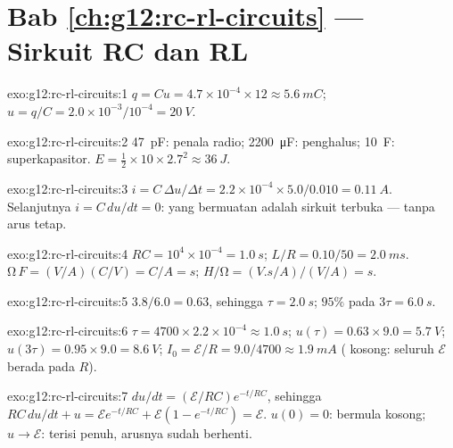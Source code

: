 \section*{Bab \ref{ch:g12:rc-rl-circuits} --- Sirkuit RC dan RL}

\begin{solution}{exo:g12:rc-rl-circuits:1}
$q = Cu = 4.7\times10^{-4} \times 12 \approx \qty{5.6}{mC}$;
$u = q/C = 2.0\times10^{-3}/10^{-4} = \qty{20}{V}$.
\end{solution}

\begin{solution}{exo:g12:rc-rl-circuits:2}
\qty{47}{pF}: penala radio; \qty{2200}{\micro F}: penghalus; \qty{10}{F}:
superkapasitor. $E = \tfrac12 \times 10 \times 2.7^2 \approx \qty{36}{J}$.
\end{solution}

\begin{solution}{exo:g12:rc-rl-circuits:3}
$i = C\,\Delta u/\Delta t = 2.2\times10^{-4} \times 5.0/0.010 =
\qty{0.11}{A}$. Selanjutnya $i = C\,du/dt = 0$:  yang bermuatan adalah
sirkuit terbuka --- tanpa arus tetap.
\end{solution}

\begin{solution}{exo:g12:rc-rl-circuits:4}
$RC = 10^4 \times 10^{-4} = \qty{1.0}{s}$;
$L/R = 0.10/50 = \qty{2.0}{ms}$. $\unit{\ohm}\,\unit{F} =
(\unit{V/A})(\unit{C/V}) = \unit{C/A} = \unit{s}$;
$\unit{H}/\unit{\ohm} = (\unit{V.s/A})/(\unit{V/A}) = \unit{s}$.
\end{solution}

\begin{solution}{exo:g12:rc-rl-circuits:5}
$3.8/6.0 = 0.63$, sehingga $\tau = \qty{2.0}{s}$; $95\%$ pada $3\tau =
\qty{6.0}{s}$.
\end{solution}

\begin{solution}{exo:g12:rc-rl-circuits:6}
$\tau = 4700 \times 2.2\times10^{-4} \approx \qty{1.0}{s}$;
$u(\tau) = 0.63 \times 9.0 = \qty{5.7}{V}$;
$u(3\tau) = 0.95 \times 9.0 = \qty{8.6}{V}$;
$I_0 = \mathcal{E}/R = 9.0/4700 \approx \qty{1.9}{mA}$ ( kosong:
seluruh $\mathcal{E}$ berada pada $R$).
\end{solution}

\begin{solution}{exo:g12:rc-rl-circuits:7}
$du/dt = (\mathcal{E}/RC)e^{-t/RC}$, sehingga $RC\,du/dt + u =
\mathcal{E}e^{-t/RC} + \mathcal{E}(1 - e^{-t/RC}) = \mathcal{E}$.
$u(0) = 0$:  bermula kosong; $u \to \mathcal{E}$: terisi
penuh, arusnya sudah berhenti.
\end{solution}

